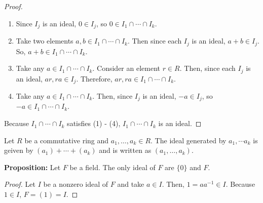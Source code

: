\documentclass [12pt] {article}
\newenvironment{definition}[1]{\begin{tcolorbox}[title={Definition: #1},colback=blue!5!white,colframe=black!75!blue]}{\end{tcolorbox}}
\renewcommand{\bf}[1]{\textbf{{#1}}}
\begin{document}
\begin{proof}
    \begin{enumerate}[label=(\arabic*), itemsep=0em]
        \item Since $I_j$ is an ideal, $0 \in I_j$, so
            $0 \in I_1 \cap \cdots \cap I_k$.
        \item Take two elements $a, b \in I_1 \cap \cdots \cap I_k$.
            Then since each $I_j$ is an ideal, $a + b \in I_j$. So,
            $a + b \in I_1 \cap \cdots \cap I_k$.
        \item Take any $a \in I_1 \cap \cdots \cap I_k$. Consider an element
            $r \in R$. Then, since each $I_j$ is an ideal, $ar, ra \in I_j$. Therefore,
            $ar, ra \in I_1 \cap \cdots \cap I_k$.
        \item Take any $a \in I_1 \cap \cdots \cap I_k$.
            Then, since $I_j$ is an ideal, $-a \in I_j$, so $-a \in I_1 \cap \cdots \cap I_k$.
    \end{enumerate}
    Because $I_1 \cap \cdots \cap I_k$ satisfies (1) - (4), $I_1 \cap \cdots \cap I_k$ is an ideal.
\end{proof}

\begin{definition}{Multiple Generators}
    Let $R$ be a commutative ring and $a_1, \ldots, a_k \in R$. The ideal generated by
    $a_1, \cdots a_k$ is geiven by $(a_1) + \cdots + (a_k)$ and is written as $(a_1, \ldots, a_k)$.
\end{definition}
\bf{Proposition:} Let $F$ be a field. The only ideal of $F$ are $\{ 0 \}$ and $F$.
\begin{proof}
    Let $I$ be a nonzero ideal of $F$ and take $a \in I$. Then, $1 = aa^{-1} \in I$. Because $1 \in I$,
    $F = (1) = I$.
\end{proof}
\end{document}
